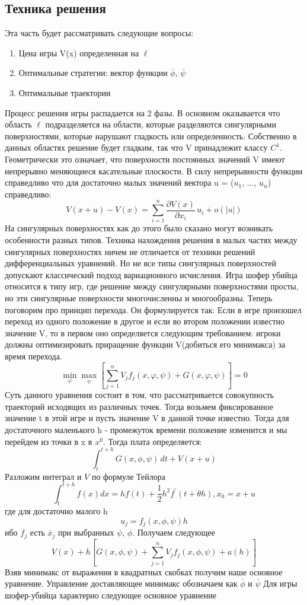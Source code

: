\documentclass[14pt,a4paper]{extarticle}
\begin{document}
	\subsection{Техника решения}
	Эта часть будет рассматривать следующие вопросы:
	\begin{enumerate}
		\item Цена игры V(x) определенная на $\ell$
		\item Оптимальные стратегии: вектор функции $\overline{\phi}$, $\overline{\psi}$
		\item Оптимальные траектории
	\end{enumerate}
	Процесс решения игры распадается на 2 фазы. В основном оказывается что область $\ell$ подразделяется на области, которые разделяются сингулярными поверхностями, которые нарушают гладкость или определенность. Собственно в данных областях решение будет гладким, так что V принадлежит классу $C^1$. Геометрически это означает, что поверхности постоянных значений V имеют непрерывно меняющиеся касательные плоскости. В силу непрерывности функции справедливо что для достаточно малых значений вектора u = ($u_1$, $\dots$, $u_n$) справедливо:
	\[
	V(x + u) - V(x) = \sum_{i=1}^{n} \frac{\partial V(x)}{\partial x_i}\, u_i + o(|u|)
	\]
	На сингулярных поверхностях как до этого было сказано могут возникать особенности разных типов. Техника нахождения решения в малых частях между сингулярных поверхностях ничем не отличается от техники решений дифференциальных уравнений. Но не все типы сингулярных поверхностей допускают классический подход вариационного исчисления. Игра шофер убийца относится к типу игр, где решение между сингулярными поверхностями просты, но эти сингулярные поверхности многочисленны и многообразны.
	Теперь поговорим про принцип перехода. Он формулируется так: Если в игре произошел переход из одного положение в другое и если во втором положении известно значение V, то в первом оно определяется следующим требованием: игроки должны оптимизировать приращение функции V(добиться его минимакса) за время перехода. 
	\[
	\min_{\varphi} \max_{\psi} \left[ \sum_{j=1}^{n} V_j f_j(x, \varphi, \psi) + G(x, \varphi, \psi) \right] = 0
	\]   
	Суть данного уравнения состоит в том, что рассматривается совокупность траекторий исходящих из различных точек. Тогда возьмем фиксированное значение t в этой игре и пусть значение V в данной точке известно. Тогда для достаточного маленького h - промежуток времени положение изменится и мы перейдем из точки в x в $x^0$. Тогда плата определяется:
	\[
	\int_{t}^{t+h} G(x, \phi, \psi)\, dt + V(x + u)
	\]
	Разложим интеграл и $V$ по формуле Тейлора 
	\[\int_{t}^{t+h}{f(x)dx} = hf(t) + \frac{1}{2}h^{2}f^{'}(t+\theta h), x_0 = x + u\]
	где для достаточно малого h  
	\[u_j = f_j(x, \phi, \psi)h\] ибо $f_j$	есть $\dot{x_j}$ при выбранных $\psi$, $\phi$. Получаем следующее
	\[
	V(x) + h\left[ G(x, \phi, \psi) + \sum_{j=1}^{n} V_j f_j(x, \phi, \psi) + a(h) \right]
	\]
	Взяв минимакс от выражения в квадратных скобках получим наше основное уравнение. Управление доставляющее минимакс обозначаем как $\overline{\phi}$ и $\overline{\psi}$
	Для игры шофер-убийца характерно следующее основное уравнение
	
\end{document}
